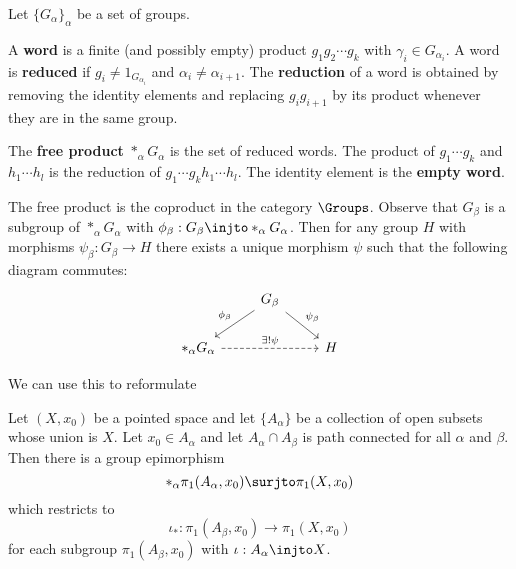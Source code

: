 \begin{defn}
	Let $\{G_\alpha\}_{\alpha}$ be a set of groups.
	\begin{itm}
		\io A \textbf{word} is a finite (and possibly empty) product $g_1g_2\cdots g_k$ with $\gamma_i \in G_{\alpha_i}$.
		\io A word is \textbf{reduced} if $g_i \neq 1_{G_{\alpha_i}}$ and $\alpha_i \neq \alpha_{i+1}$.
		\io The \textbf{reduction} of a word is obtained by removing the identity elements and replacing $g_ig_{i+1}$ by its product whenever they are in the same group.
	\end{itm}
	The \textbf{free product} $*_\alpha G_\alpha$ is the set of reduced words.
	The product of $g_1\cdots g_k$ and $h_1 \cdots h_l$ is the reduction of $g_1\cdots g_kh_1 \cdots h_l$.
	The identity element is the \textbf{empty word}.
\end{defn}

\begin{prop}
	The free product is the coproduct in the category $\Groups$.
	Observe that $G_\beta$ is a subgroup of $*_\alpha G_\alpha$ with $\phi_\beta: G_\beta \injto *_\alpha G_\alpha$.
	Then for any group $H$ with morphisms $\psi_\beta: G_\beta \to H$ there exists a unique morphism $\psi$ such that the following diagram commutes:
	\[
	\begin{tikzcd}
		& G_\beta \ar[ld, swap, "\phi_\beta"] \ar[rd, "\psi_\beta"] & \\
		*_\alpha G_\alpha \ar[rr, dashed, "\exists ! \psi"] & & H
	\end{tikzcd}
	\]
\end{prop}

We can use this to reformulate

\begin{lem}\label{7:vk-lem}
	Let $(X,x_0)$ be a pointed space and let $\{A_\alpha\}$ be a collection of open subsets whose union is $X$.
	Let $x_0 \in A_\alpha$ and let $A_\alpha \cap A_\beta$ is path connected for all $\alpha$ and $\beta$.
	Then there is a group epimorphism
	\[*_\alpha \pi_1(A_\alpha,x_0) \surjto \pi_1(X,x_0)\]
	which restricts to
	\[\iota_*: \pi_1(A_\beta,x_0) \to \pi_1(X,x_0)\]
	for each subgroup $\pi_1(A_\beta, x_0)$ with $\iota:A_\alpha \injto X$.
\end{lem}